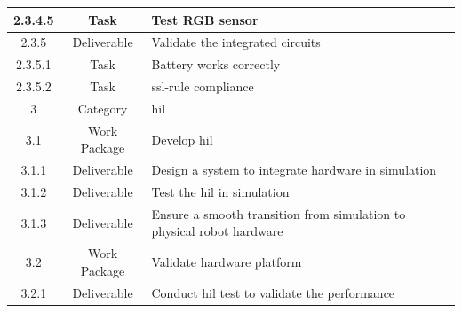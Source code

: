 \begin{longtable}{|c|c|m{}|}
    \rowcolor{c2-t} 2.3.4.5 & Task & Test RGB sensor \\ \hline
    \rowcolor{c2-d} 2.3.5 & Deliverable & Validate the integrated circuits \\ \hline
    \rowcolor{c2-t} 2.3.5.1 & Task & Battery works correctly \\ \hline
    \rowcolor{c2-t} 2.3.5.2 & Task & \acs{ssl}-rule compliance \\ \hline
    \rowcolor{c3} 3 & Category & \acs{hil} \\ \hline
    \rowcolor{c3-wp} 3.1 & Work Package & Develop \acs{hil} \\ \hline
    \rowcolor{c3-d} 3.1.1 & Deliverable & Design a system to integrate hardware in simulation \\ \hline
    \rowcolor{c3-d} 3.1.2 & Deliverable & Test the \acs{hil} in simulation \\ \hline
    \rowcolor{c3-d} 3.1.3 & Deliverable & Ensure a smooth transition from simulation to physical robot hardware \\ \hline
    \rowcolor{c3-wp} 3.2 & Work Package & Validate hardware platform \\ \hline
    \rowcolor{c3-d} 3.2.1 & Deliverable & Conduct \acs{hil} test to validate the performance \\ \hline
\end{longtable}


